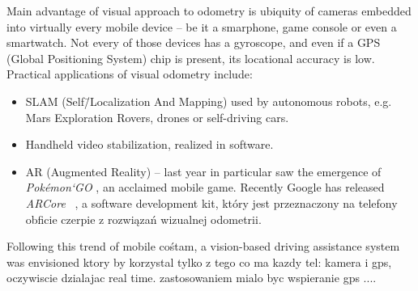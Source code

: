 
Main advantage of visual approach to odometry is ubiquity of cameras embedded into virtually every mobile device -- be it a smarphone, game console or even a smartwatch. Not every of those devices has a gyroscope, and even if a GPS (Global Positioning System) chip is present, its locational accuracy is low. Practical applications of visual odometry include:
\begin{itemize}
	\item SLAM (Self\=/Localization And Mapping) used by autonomous robots, e.g. Mars Exploration Rovers, drones or self-driving cars.
	
	\item Handheld video stabilization, realized in software.
	
	\item AR (Augmented Reality) -- last year in particular saw the emergence of \textit{Pok\'emon`GO} \cite{pineco}, an acclaimed mobile game. Recently Google has released \textit{ARCore}~\cite{androidvr} , a software development kit, który jest przeznaczony na telefony obficie czerpie z rozwiązań wizualnej odometrii.
\end{itemize}


Following this trend of mobile cośtam, a vision-based driving assistance system was envisioned ktory by korzystal tylko z tego co ma kazdy tel: kamera i gps, oczywiscie dzialajac real time. zastosowaniem mialo byc wspieranie gps ....









